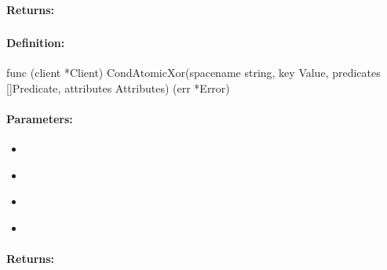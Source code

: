 \paragraph{Returns:}


\pagebreak
\subsubsection{}
\label{api:Go:CondAtomicXor}


\paragraph{Definition:}
\begin{gocode}
func (client *Client) CondAtomicXor(spacename string, key Value, predicates []Predicate, attributes Attributes) (err *Error)
\end{gocode}

\paragraph{Parameters:}
\begin{itemize}[noitemsep]
\item {}\\

\item {}\\

\item {}\\

\item {}\\

\end{itemize}

\paragraph{Returns:}


\pagebreak
\subsubsection{}
\label{api:Go:GroupAtomicXor}


